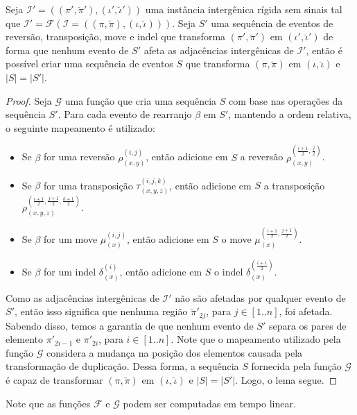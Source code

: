 \begin{lemma}\label{lemma:GTTULLOM}
Seja $\mathcal{I'} = ((\pi',\breve\pi'),(\iota',\breve\iota'))$ uma instância intergênica rígida sem sinais tal que $\mathcal{I'}=\mathcal{F}(\mathcal{I}=((\pi,\breve\pi),(\iota,\breve\iota)))$. Seja $S'$ uma sequência de eventos de reversão, transposição, move e indel que transforma $(\pi',\breve\pi')$ em $(\iota',\breve\iota')$ de forma que nenhum evento de $S'$ afeta as adjacências intergênicas de $\mathcal{I'}$, então é possível criar uma sequência de eventos $S$ que transforma $(\pi,\breve\pi)$ em $(\iota,\breve\iota)$ e $|S|=|S'|$.
\end{lemma}
\begin{proof}
Seja $\mathcal{G}$ uma função que cria uma sequência $S$ com base nas operações da sequência $S'$. Para cada evento de rearranjo $\beta$ em $S'$, mantendo a ordem relativa, o seguinte mapeamento é utilizado:
\begin{itemize}
  \item Se $\beta$ for uma reversão $\rho^{(i,j)}_{(x,y)}$, então adicione em $S$ a reversão $\rho^{(\frac{i+1}{2},\frac{j}{2})}_{(x,y)}$.
  \item Se $\beta$ for uma transposição $\tau^{(i,j,k)}_{(x,y,z)}$, então adicione em $S$ a transposição $\rho^{(\frac{i+1}{2},\frac{j+1}{2},\frac{k+1}{2})}_{(x,y,z)}$.
  \item Se $\beta$ for um move $\mu^{(i,j)}_{(x)}$, então adicione em $S$ o move $\mu^{(\frac{i+1}{2},\frac{j+1}{2})}_{(x)}$.
  \item Se $\beta$ for um indel $\delta^{(i)}_{(x)}$, então adicione em $S$ o indel $\delta^{(\frac{i+1}{2})}_{(x)}$. 
\end{itemize}
Como as adjacências intergênicas de $\mathcal{I'}$ não são afetadas por qualquer evento de $S'$, então isso significa que nenhuma região $\breve\pi'_{2j}$, para $j\in[1..n]$, foi afetada. Sabendo disso, temos a garantia de que nenhum evento de $S'$ separa os pares de elemento $\pi'_{2i-1}$ e $\pi'_{2i}$, para $i\in[1..n]$. Note que o mapeamento utilizado pela função $\mathcal{G}$ considera a mudança na posição dos elementos causada pela transformação de duplicação. Dessa forma, a sequência $S$ fornecida pela função $\mathcal{G}$ é capaz de transformar $(\pi,\breve\pi)$ em $(\iota,\breve\iota)$ e $|S|=|S'|$. Logo, o lema segue.
\end{proof}

Note que as funções $\mathcal{F}$ e $\mathcal{G}$ podem ser computadas em tempo linear.

